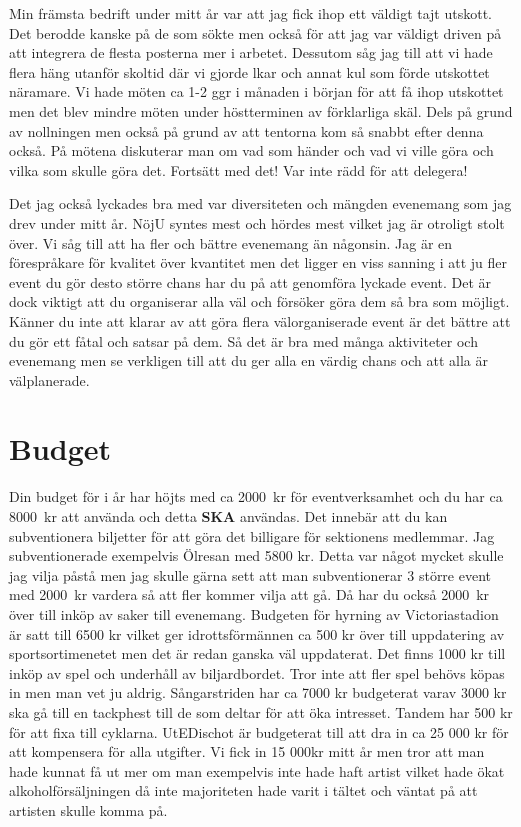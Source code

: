 \documentclass[10pt]{article}
\begin{document}
    Min främsta bedrift under mitt år var att jag fick ihop ett väldigt tajt utskott. Det berodde kanske på de som sökte men också för att jag var väldigt driven på att integrera de flesta posterna mer i arbetet. Dessutom såg jag till att vi hade flera häng utanför skoltid där vi gjorde lkar och annat kul som förde utskottet näramare. Vi hade möten ca 1-2 ggr i månaden i början för att få ihop utskottet men det blev mindre möten under höstterminen av förklarliga skäl. Dels på grund av nollningen men också på grund av att tentorna kom så snabbt efter denna också. På mötena diskuterar man om vad som händer och vad vi ville göra och vilka som skulle göra det. Fortsätt med det!  Var inte rädd för att delegera! 

    Det jag också lyckades bra med var diversiteten och mängden evenemang som jag drev under mitt år. NöjU syntes mest och hördes mest vilket jag är otroligt stolt över. Vi såg till att ha fler och bättre evenemang än någonsin. Jag är en förespråkare för kvalitet över kvantitet men det ligger en viss sanning i att ju fler event du gör desto större chans har du på att genomföra lyckade event. Det är dock viktigt att du organiserar alla väl och försöker göra dem så bra som möjligt. Känner du inte att klarar av att göra flera välorganiserade event är det bättre att du gör ett fåtal och satsar på dem. Så det är bra med många aktiviteter och evenemang men se verkligen till att du ger alla en värdig chans och att alla är välplanerade.

    \newpage
    
    \section{Budget}
    Din budget för i år har höjts med ca \SI{2000}{kr} för eventverksamhet och du har ca \SI{8000}{kr} att använda och detta \textbf{SKA} användas. Det innebär att du kan subventionera biljetter för att göra det billigare för sektionens medlemmar. Jag subventionerade exempelvis Ölresan med 5800 kr. Detta var något mycket skulle jag vilja påstå men jag skulle gärna sett att man subventionerar 3 större event med \SI{2000}{kr} vardera så att fler kommer vilja att gå. Då har du också \SI{2000}{kr} över till inköp av saker till evenemang. \newline
    Budgeten för hyrning av Victoriastadion är satt till 6500 kr vilket ger idrottsförmännen ca 500 kr över till uppdatering av sportsortimenetet men det är redan ganska väl uppdaterat. Det finns 1000 kr till inköp av spel och underhåll av biljardbordet. Tror inte att fler spel behövs köpas in men man vet ju aldrig. \newline
    Sångarstriden har ca 7000 kr budgeterat varav 3000 kr ska gå till en tackphest till de som deltar för att öka intresset. \newline
    Tandem har 500 kr för att fixa till cyklarna. \newline
    UtEDischot är budgeterat till att dra in ca 25 000 kr för att kompensera för alla utgifter. Vi fick in 15 000kr mitt år men tror att man hade kunnat få ut mer om man exempelvis inte hade haft artist vilket hade ökat alkoholförsäljningen då inte majoriteten hade varit i tältet och väntat på att artisten skulle komma på.
\end{document}
